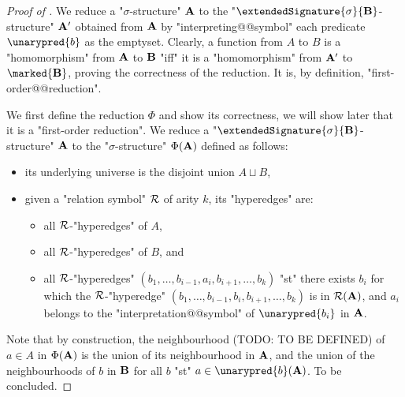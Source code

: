   \begin{proof}[Proof of ]
	We reduce a "$\sigma$-structure" $\mathbf{A}$ to the
	"$\extendedSignature{\sigma}{\?B}$-structure" $\mathbf{A}'$ obtained
	from $\mathbf{A}$ by "interpreting@@symbol" each predicate $\unarypred{b}$ as the emptyset.
	Clearly, a function from $A$ to $B$ is a "homomorphism" from $\mathbf{A}$ to $\mathbf{B}$
	"iff" it is a "homomorphism" from $\mathbf{A}'$ to $\marked{\?B}$, proving the correctness
	of the reduction. It is, by definition, "first-order@@reduction".
  
	We first define the reduction $\Phi$ and show its correctness, we will show later that it
	is a "first-order reduction". We reduce a "$\extendedSignature{\sigma}{\?B}$-structure" $\mathbf{A}$ to the "$\sigma$-structure"
	$\Phi(\mathbf{A})$ defined as follows:
	\begin{itemize}
	  \item its underlying universe is the disjoint union $A \sqcup B$,
	  \item given a "relation symbol" $\mathcal{R}$ of arity $k$, its "hyperedges" are:
	  \begin{itemize}
		\item all $\mathcal{R}$-"hyperedges" of $A$,
		\item all $\mathcal{R}$-"hyperedges" of $B$, and
		\item all $\mathcal{R}$-"hyperedges" $(b_1,\hdots,b_{i-1}, a_i, b_{i+1},\hdots,b_k)$
		  "st" there exists $b_i$ for which the $\mathcal{R}$-"hyperedge"
		  $(b_1,\hdots,b_{i-1}, b_i, b_{i+1},\hdots,b_k)$
		  is in $\mathcal{R}(\mathbf{A})$, and $a_i$ belongs to the "interpretation@@symbol" of 
		  $\unarypred{b_i}$ in $\mathbf{A}$.
	  \end{itemize}
	\end{itemize}
	Note that by construction, the neighbourhood (TODO: TO BE DEFINED) of $a \in A$ in $\Phi(\mathbf{A})$ is
	the union of its neighbourhood in $\mathbf{A}$, and the union of the neighbourhoods of
	$b$ in $\mathbf{B}$ for all $b$ "st" $a \in \unarypred{b}(\?A)$.
	To be concluded.  
  \end{proof}